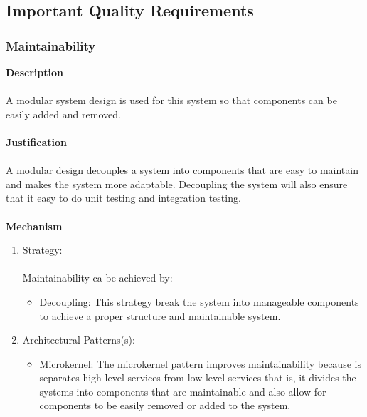 \documentclass[hidelinks, 12pt, oneside]{article}
\begin{document}
		\subsection{Important Quality Requirements}
			\subsubsection{Maintainability}
			\textbf{Description}\\\\
			A modular system design is used for this system so that components can be easily added and removed.\\\\
			\textbf{Justification}\\\\
			A modular design decouples a system into components that are easy to maintain and makes the system more adaptable. Decoupling the system will also ensure that it easy to do unit testing and integration testing.\\\\
			\textbf{Mechanism}
			\begin{enumerate}
				\item Strategy:\\\\
				Maintainability ca be achieved by:
				\begin{itemize}
				\item Decoupling: This strategy break the system into manageable components to achieve a proper structure and maintainable system.  
				\end{itemize}
				\item Architectural Patterns(s):
				\begin{itemize}
				\item Microkernel: The microkernel pattern improves maintainability because is separates high level services  from low level services that is, it divides the systems into components that are maintainable and also allow for components to be easily removed or added to the system.
				\end{itemize}
			\end{enumerate}
			\newpage
\end{document}
